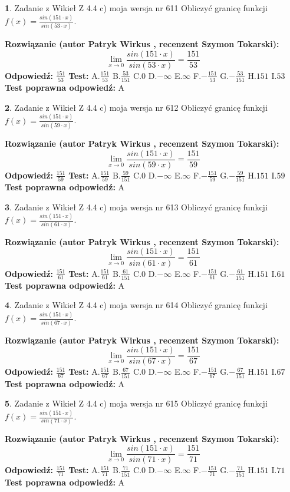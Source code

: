 \documentclass[12pt, a4paper]{article}
\theoremstyle{definition} %
\newtheorem{zad}{}
\newcommand{\zadStart}[1]{\begin{zad}#1\newline}
\newcommand{\zadStop}{\end{zad}}
\newcommand{\rozwStart}[2]{\noindent \textbf{Rozwiązanie (autor #1 , recenzent #2): }\newline}
\newcommand{\rozwStop}{\newline}
\newcommand{\odpStart}{\noindent \textbf{Odpowiedź:}\newline}
\newcommand{\odpStop}{\newline}
\newcommand{\testStart}{\noindent \textbf{Test:}\newline}
\newcommand{\testStop}{\newline}
\newcommand{\kluczStart}{\noindent \textbf{Test poprawna odpowiedź:}\newline}
\newcommand{\kluczStop}{\newline}
\begin{document}
\zadStart{Zadanie z Wikieł Z 4.4 c) moja wersja nr 611}
Obliczyć granicę funkcji $f(x)=\frac{sin(151\cdot x)}{sin(53\cdot x)}$.
\zadStop
\rozwStart{Patryk Wirkus}{Szymon Tokarski}
$$\lim\limits_{x\to 0}\frac{sin(151\cdot x)}{sin(53\cdot x)}=
\frac{151}{53}$$
\rozwStop
\odpStart
$\frac{151}{53}$
\odpStop
\testStart
A.$\frac{151}{53}$
B.$\frac{53}{151}$
C.$0$
D.$-\infty$
E.$\infty$
F.$-\frac{151}{53}$
G.$-\frac{53}{151}$
H.$151$
I.$53$
\testStop
\kluczStart
A
\kluczStop



\zadStart{Zadanie z Wikieł Z 4.4 c) moja wersja nr 612}
Obliczyć granicę funkcji $f(x)=\frac{sin(151\cdot x)}{sin(59\cdot x)}$.
\zadStop
\rozwStart{Patryk Wirkus}{Szymon Tokarski}
$$\lim\limits_{x\to 0}\frac{sin(151\cdot x)}{sin(59\cdot x)}=
\frac{151}{59}$$
\rozwStop
\odpStart
$\frac{151}{59}$
\odpStop
\testStart
A.$\frac{151}{59}$
B.$\frac{59}{151}$
C.$0$
D.$-\infty$
E.$\infty$
F.$-\frac{151}{59}$
G.$-\frac{59}{151}$
H.$151$
I.$59$
\testStop
\kluczStart
A
\kluczStop



\zadStart{Zadanie z Wikieł Z 4.4 c) moja wersja nr 613}
Obliczyć granicę funkcji $f(x)=\frac{sin(151\cdot x)}{sin(61\cdot x)}$.
\zadStop
\rozwStart{Patryk Wirkus}{Szymon Tokarski}
$$\lim\limits_{x\to 0}\frac{sin(151\cdot x)}{sin(61\cdot x)}=
\frac{151}{61}$$
\rozwStop
\odpStart
$\frac{151}{61}$
\odpStop
\testStart
A.$\frac{151}{61}$
B.$\frac{61}{151}$
C.$0$
D.$-\infty$
E.$\infty$
F.$-\frac{151}{61}$
G.$-\frac{61}{151}$
H.$151$
I.$61$
\testStop
\kluczStart
A
\kluczStop



\zadStart{Zadanie z Wikieł Z 4.4 c) moja wersja nr 614}
Obliczyć granicę funkcji $f(x)=\frac{sin(151\cdot x)}{sin(67\cdot x)}$.
\zadStop
\rozwStart{Patryk Wirkus}{Szymon Tokarski}
$$\lim\limits_{x\to 0}\frac{sin(151\cdot x)}{sin(67\cdot x)}=
\frac{151}{67}$$
\rozwStop
\odpStart
$\frac{151}{67}$
\odpStop
\testStart
A.$\frac{151}{67}$
B.$\frac{67}{151}$
C.$0$
D.$-\infty$
E.$\infty$
F.$-\frac{151}{67}$
G.$-\frac{67}{151}$
H.$151$
I.$67$
\testStop
\kluczStart
A
\kluczStop



\zadStart{Zadanie z Wikieł Z 4.4 c) moja wersja nr 615}
Obliczyć granicę funkcji $f(x)=\frac{sin(151\cdot x)}{sin(71\cdot x)}$.
\zadStop
\rozwStart{Patryk Wirkus}{Szymon Tokarski}
$$\lim\limits_{x\to 0}\frac{sin(151\cdot x)}{sin(71\cdot x)}=
\frac{151}{71}$$
\rozwStop
\odpStart
$\frac{151}{71}$
\odpStop
\testStart
A.$\frac{151}{71}$
B.$\frac{71}{151}$
C.$0$
D.$-\infty$
E.$\infty$
F.$-\frac{151}{71}$
G.$-\frac{71}{151}$
H.$151$
I.$71$
\testStop
\kluczStart
A
\kluczStop
\end{document}
